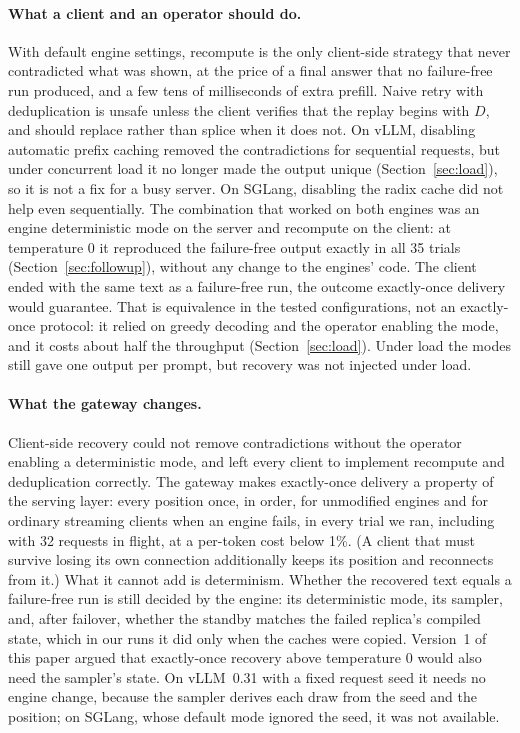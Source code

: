 \documentclass[10pt,twocolumn]{article}
\begin{document}
\paragraph{What a client and an operator should do.} With default
engine settings, recompute is the only client-side strategy that never
contradicted what was shown, at the
price of a final answer that no failure-free run produced, and a few tens of
milliseconds of extra prefill. Naive retry with deduplication is unsafe
unless the client verifies that the replay begins with $D$, and should
replace rather than splice when it does not. On vLLM, disabling automatic
prefix caching removed the contradictions for sequential requests, but under
concurrent load it no longer made the output unique
(Section~\ref{sec:load}), so it is not a fix for a busy server. On SGLang,
disabling the radix cache did not help even sequentially. The combination
that worked on both engines
was an engine deterministic mode on the server and recompute on the client:
at temperature 0 it reproduced the failure-free output exactly in all 35
trials (Section~\ref{sec:followup}), without any change to the engines'
code. The client ended with the same text as a failure-free run, the
outcome exactly-once delivery would guarantee. That is equivalence in the
tested configurations, not an exactly-once protocol: it relied on greedy
decoding and the operator enabling the mode, and it costs about half the
throughput (Section~\ref{sec:load}). Under load the modes still gave one
output per prompt, but recovery was not injected under load.

\paragraph{What the gateway changes.} Client-side recovery could not
remove contradictions without the operator enabling a deterministic mode,
and left every client to implement recompute and deduplication correctly.
The gateway makes exactly-once delivery a property of the serving layer:
every position once, in order, for unmodified engines and for ordinary
streaming clients when an engine fails, in every trial we ran, including with
32 requests in flight, at a per-token cost below 1\%. (A client that must
survive losing its own connection additionally keeps its position and
reconnects from it.) What it cannot add is
determinism. Whether the recovered text equals a failure-free run is still
decided by the engine: its deterministic mode, its sampler, and, after
failover, whether the standby matches the failed replica's compiled state,
which in our runs it did only when the caches were copied.
Version~1 of this paper argued that exactly-once recovery above temperature
0 would also need the sampler's state. On vLLM~0.31 with a fixed request seed
it needs no engine change, because the sampler derives each draw from the
seed and the position; on SGLang, whose default mode ignored the seed, it was
not available.
\end{document}
